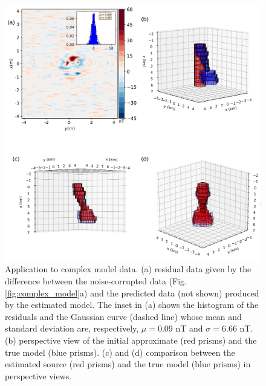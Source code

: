 \begin{figure}
    \centering
    \includegraphics[scale=.5]{figures/complex_results.png}
    \caption{Application to complex model data. (a) residual data given by the difference between the noise-corrupted data (Fig. \ref{fig:complex_model}a) and the predicted data (not shown) produced by the estimated model. The inset in (a) shows the histogram of the residuals and the Gaussian curve (dashed line) whose mean and standard deviation are, respectively, $\mu = 0.09$ nT and $\sigma=6.66$ nT. (b) perspective view of the initial approximate (red prisms) and the true model (blue prisms). (c) and (d) comparison between the estimated source (red prisms) and the true model (blue prisms) in perspective views. 
}
    \label{fig:complex_result}
\end{figure}


